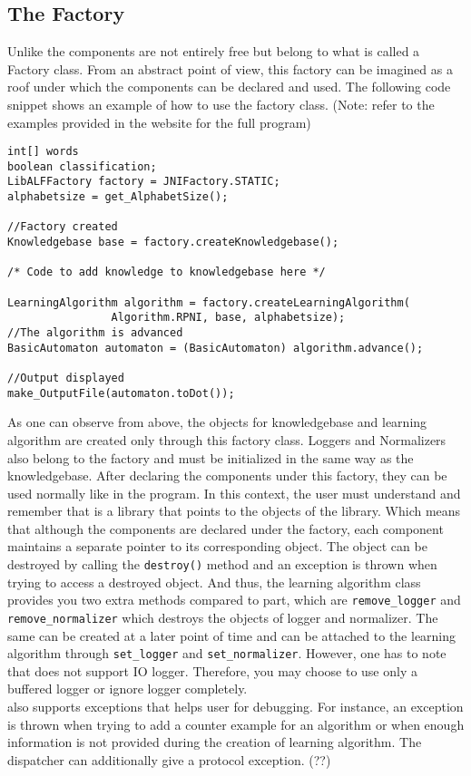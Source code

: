 \subsection*{The \jalf Factory}
Unlike \libalf the components are not entirely free but belong to what is called a Factory class. From an abstract point of view, this factory can be imagined as a roof under which the components can be declared and used. The following code snippet shows an example of how to use the factory class. (Note: refer to the examples provided in the \libalf website for the full program)

\begin{lstlisting}
int[] words
boolean classification;
LibALFFactory factory = JNIFactory.STATIC;
alphabetsize = get_AlphabetSize();

//Factory created
Knowledgebase base = factory.createKnowledgebase();

/* Code to add knowledge to knowledgebase here */

LearningAlgorithm algorithm = factory.createLearningAlgorithm(
				Algorithm.RPNI, base, alphabetsize);
//The algorithm is advanced
BasicAutomaton automaton = (BasicAutomaton) algorithm.advance();

//Output displayed
make_OutputFile(automaton.toDot());

\end{lstlisting}

As one can observe from above, the objects for knowledgebase and learning algorithm are created only through this factory class. Loggers and Normalizers also belong to the factory and must be initialized in the same way as the knowledgebase. After declaring the components under this factory, they can be used normally like in the \cpp program. In this context, the user must understand and remember that \jalf is a library that points to the objects of the \cpp \libalf library. Which means that although the components are declared under the factory, each component maintains a separate pointer to its corresponding \cpp object. The object can be destroyed by calling the \texttt{destroy()} method and an exception is thrown when trying to access a destroyed object. And thus, the learning algorithm class provides you two extra methods compared to \libalf \cpp part, which are \texttt{remove\_logger} and \texttt{remove\_normalizer} which destroys the objects of logger and normalizer. The same can be created at a later point of time and can be attached to the learning algorithm through \texttt{set\_logger} and \texttt{set\_normalizer}. However, one has to note that \jalf does not support IO logger. Therefore, you may choose to use only a buffered logger or ignore logger completely. \\
\jalf also supports exceptions that helps user for debugging. For instance, an exception is thrown when trying to add a counter example for an \offline algorithm or when enough information is not provided during the creation of learning algorithm. The dispatcher can additionally give a protocol exception. (??)\\

